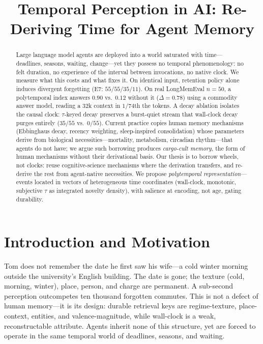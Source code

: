 \documentclass[letterpaper]{article}
\title{Temporal Perception in AI: Re-Deriving Time for Agent Memory}
\author{}
\begin{document}
\maketitle
\begin{abstract}
Large language model agents are deployed into a world saturated with time---deadlines, seasons, waiting, change---yet they possess no temporal phenomenology: no felt duration, no experience of the interval between invocations, no native clock. We measure what this costs and what fixes it. On identical input, retention policy alone induces divergent forgetting (E7: $55$/$55$/$35$/$11$). On real LongMemEval $n{=}50$, a polytemporal index answers $0.90$ vs.\ $0.12$ without it ($\Delta{=}0.78$) using a commodity answer model, reading a $32$k context in $1/74$th the tokens. A decay ablation isolates the causal clock: $\tau$-keyed decay preserves a burst-quiet stream that wall-clock decay purges entirely ($35/55$ vs.\ $0/55$). Current practice copies human memory mechanisms (Ebbinghaus decay, recency weighting, sleep-inspired consolidation) whose parameters derive from biological necessities---mortality, metabolism, circadian rhythm---that agents do not have; we argue such borrowing produces \emph{cargo-cult memory}, the form of human mechanisms without their derivational basis. Our thesis is to borrow wheels, not clocks: reuse cognitive-science mechanisms where the derivation transfers, and re-derive the rest from agent-native necessities. We propose \emph{polytemporal representation}---events located in vectors of heterogeneous time coordinates (wall-clock, monotonic, subjective $\tau$ as integrated novelty density), with salience at encoding, not age, gating durability.
\end{abstract}

\section{Introduction and Motivation}
Tom does not remember the date he first saw his wife---a cold winter morning outside the university's English building. The date is gone; the texture (cold, morning, winter), place, person, and charge are permanent. A sub-second perception outcompetes ten thousand forgotten commutes. This is not a defect of human memory---it is its design: durable retrieval keys are regime-texture, place-context, entities, and valence-magnitude, while wall-clock is a weak, reconstructable attribute. Agents inherit none of this structure, yet are forced to operate in the same temporal world of deadlines, seasons, and waiting.
\end{document}
